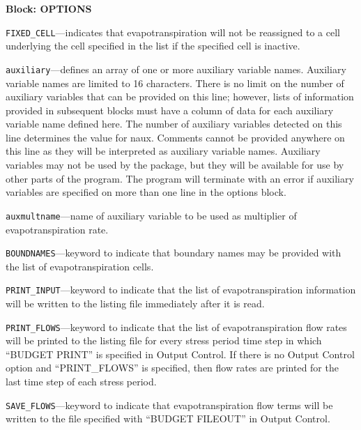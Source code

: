 
\item \textbf{Block: OPTIONS}

\begin{description}
\item \texttt{FIXED\_CELL}---indicates that evapotranspiration will not be reassigned to a cell underlying the cell specified in the list if the specified cell is inactive.

\item \texttt{auxiliary}---defines an array of one or more auxiliary variable names.  Auxiliary variable names are limited to 16 characters.  There is no limit on the number of auxiliary variables that can be provided on this line; however, lists of information provided in subsequent blocks must have a column of data for each auxiliary variable name defined here.  The number of auxiliary variables detected on this line determines the value for naux.  Comments cannot be provided anywhere on this line as they will be interpreted as auxiliary variable names.  Auxiliary variables may not be used by the package, but they will be available for use by other parts of the program.  The program will terminate with an error if auxiliary variables are specified on more than one line in the options block.

\item \texttt{auxmultname}---name of auxiliary variable to be used as multiplier of evapotranspiration rate.

\item \texttt{BOUNDNAMES}---keyword to indicate that boundary names may be provided with the list of evapotranspiration cells.

\item \texttt{PRINT\_INPUT}---keyword to indicate that the list of evapotranspiration information will be written to the listing file immediately after it is read.

\item \texttt{PRINT\_FLOWS}---keyword to indicate that the list of evapotranspiration flow rates will be printed to the listing file for every stress period time step in which ``BUDGET PRINT'' is specified in Output Control.  If there is no Output Control option and ``PRINT\_FLOWS'' is specified, then flow rates are printed for the last time step of each stress period.

\item \texttt{SAVE\_FLOWS}---keyword to indicate that evapotranspiration flow terms will be written to the file specified with ``BUDGET FILEOUT'' in Output Control.


\end{description}
